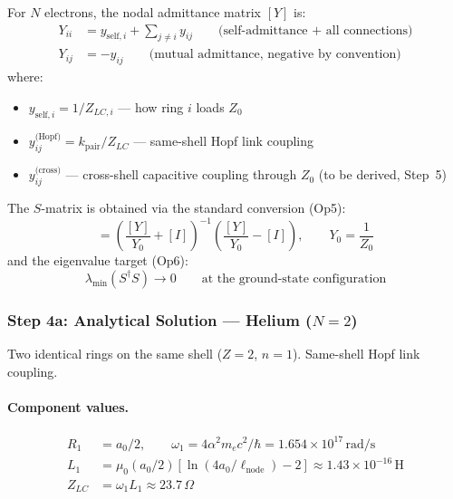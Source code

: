 For $N$ electrons, the nodal admittance matrix $[Y]$ is:
\begin{align}
    Y_{ii} &= y_{\text{self},i} + \sum_{j \neq i} y_{ij}
    \qquad \text{(self-admittance + all connections)} \\
    Y_{ij} &= -y_{ij}
    \qquad \text{(mutual admittance, negative by convention)}
\end{align}
where:
\begin{itemize}
    \item $y_{\text{self},i} = 1/Z_{LC,i}$ --- how ring $i$ loads $Z_0$
    \item $y_{ij}^{\text{(Hopf)}} = k_{\text{pair}} / Z_{LC}$
          --- same-shell Hopf link coupling
    \item $y_{ij}^{\text{(cross)}}$ --- cross-shell capacitive
          coupling through $Z_0$ (to be derived, Step~5)
\end{itemize}

The $S$-matrix is obtained via the standard conversion (Op5):
\begin{equation}
    [S] = \left(\frac{[Y]}{Y_0} + [I]\right)^{-1}
    \left(\frac{[Y]}{Y_0} - [I]\right),
    \qquad Y_0 = \frac{1}{Z_0}
\end{equation}
and the eigenvalue target (Op6):
\begin{equation}
    \lambda_{\min}\!\left(S^\dagger S\right) \to 0
    \qquad \text{at the ground-state configuration}
\end{equation}

\subsubsection{Step 4a: Analytical Solution --- Helium ($N=2$)}

Two identical rings on the same shell ($Z=2$, $n=1$).
Same-shell Hopf link coupling.

\paragraph{Component values.}
\begin{align}
    R_1 &= a_0/2, \qquad \omega_1 = 4\alpha^2 m_e c^2/\hbar
    = 1.654 \times 10^{17}\,\text{rad/s} \\
    L_1 &= \mu_0 (a_0/2) [\ln(4a_0/\ell_{\text{node}}) - 2]
    \approx 1.43 \times 10^{-16}\,\text{H} \\
    Z_{LC} &= \omega_1 L_1 \approx 23.7\,\Omega
\end{align}

